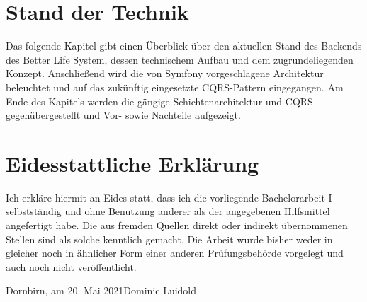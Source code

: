 \documentclass[a4paper,12pt,twoside]{scrreprt}
\begin{document}
\chapter{Stand der Technik}
\label{chap:stand-technik}
Das folgende Kapitel gibt einen Überblick über den aktuellen Stand des Backends des Better Life System, dessen technischem Aufbau und dem zugrundeliegenden Konzept. Anschließend wird die von Symfony vorgeschlagene Architektur beleuchtet und auf das zukünftig eingesetzte CQRS-Pattern eingegangen. Am Ende des Kapitels werden die gängige Schichtenarchitektur und CQRS gegenübergestellt und Vor- sowie Nachteile aufgezeigt.

\clearpage
{}
{}
\printbibliography

\chapter*{Eidesstattliche Erklärung}
Ich erkläre hiermit an Eides statt, dass ich die vorliegende Bachelorarbeit I selbstständig und ohne Benutzung anderer als der angegebenen Hilfsmittel angefertigt habe. Die aus fremden Quellen direkt oder indirekt übernommenen Stellen sind als solche kenntlich gemacht. Die Arbeit wurde bisher weder in gleicher noch in ähnlicher Form einer anderen Prüfungsbehörde vorgelegt und auch noch nicht veröffentlicht.

\vspace{5cm}
\noindent
Dornbirn, am 20. Mai 2021\hfill Dominic Luidold
\end{document}
